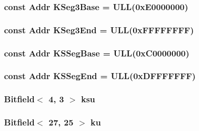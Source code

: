 \label{namespaceMipsISA_ad90b05c1f6375f46c143d07924601551}
\hypertarget{namespaceMipsISA_a53c72053cff8d2410c867bd04c7e8838}{
\subsubsection[{KSeg3Base}]{\setlength{\rightskip}{0pt plus 5cm}const {\bf Addr} {\bf KSeg3Base} = ULL(0xE0000000)}}
\label{namespaceMipsISA_a53c72053cff8d2410c867bd04c7e8838}
\hypertarget{namespaceMipsISA_a1d52f1ba85447a440e326de0bda5f360}{
\subsubsection[{KSeg3End}]{\setlength{\rightskip}{0pt plus 5cm}const {\bf Addr} {\bf KSeg3End} = ULL(0xFFFFFFFF)}}
\label{namespaceMipsISA_a1d52f1ba85447a440e326de0bda5f360}
\hypertarget{namespaceMipsISA_aa0fc64a650db916ba182c49770748467}{
\subsubsection[{KSSegBase}]{\setlength{\rightskip}{0pt plus 5cm}const {\bf Addr} {\bf KSSegBase} = ULL(0xC0000000)}}
\label{namespaceMipsISA_aa0fc64a650db916ba182c49770748467}
\hypertarget{namespaceMipsISA_a403fce24705117c576c91259ed1fe53e}{
\subsubsection[{KSSegEnd}]{\setlength{\rightskip}{0pt plus 5cm}const {\bf Addr} {\bf KSSegEnd} = ULL(0xDFFFFFFF)}}
\label{namespaceMipsISA_a403fce24705117c576c91259ed1fe53e}
\hypertarget{namespaceMipsISA_aec77ac7da21a12c9ba945e3dc3f0e2e7}{
\subsubsection[{ksu}]{\setlength{\rightskip}{0pt plus 5cm}Bitfield$<$ 4, 3 $>$ {\bf ksu}}}
\label{namespaceMipsISA_aec77ac7da21a12c9ba945e3dc3f0e2e7}
\hypertarget{namespaceMipsISA_a52f64f3fd2a0f5d587a1a6c46d183f96}{
\subsubsection[{ku}]{\setlength{\rightskip}{0pt plus 5cm}Bitfield$<$ 27, 25 $>$ {\bf ku}}}
